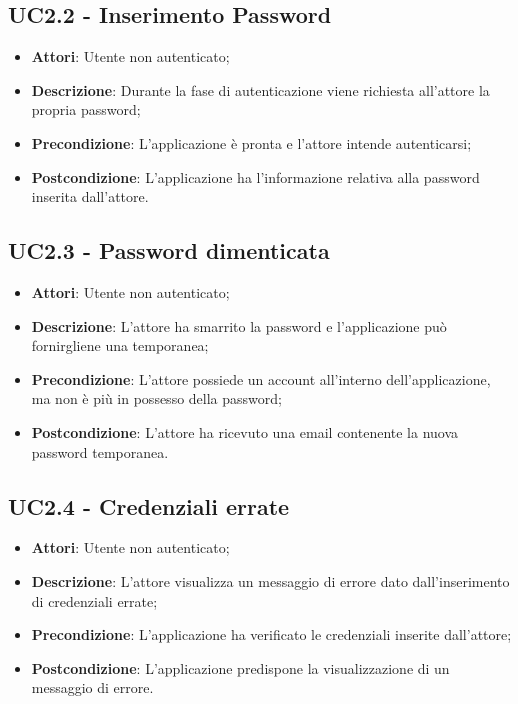 \subsection{UC2.2 - Inserimento Password} 
\label{ssec:UC2.2} 
\begin{itemize} 
\item \textbf{Attori}: Utente non autenticato;
\item \textbf{Descrizione}: Durante la fase di autenticazione viene richiesta all'attore la propria password;
\item \textbf{Precondizione}: L'applicazione è pronta e l'attore intende autenticarsi;
\item \textbf{Postcondizione}: L'applicazione ha l’informazione relativa alla password inserita dall’attore.
\end{itemize} 
\subsection{UC2.3 - Password dimenticata} 
\label{ssec:UC2.3} 
\begin{itemize} 
\item \textbf{Attori}: Utente non autenticato;
\item \textbf{Descrizione}: L'attore ha smarrito la password e l'applicazione può fornirgliene una temporanea;
\item \textbf{Precondizione}: L'attore possiede un account all'interno dell'applicazione, ma non è più in possesso della password;
\item \textbf{Postcondizione}: L'attore ha ricevuto una email contenente la nuova password temporanea.
\end{itemize} 
\subsection{UC2.4 - Credenziali errate} 
\label{ssec:UC2.4} 
\begin{itemize} 
\item \textbf{Attori}: Utente non autenticato;
\item \textbf{Descrizione}: L’attore visualizza un messaggio di errore dato dall’inserimento di credenziali errate;
\item \textbf{Precondizione}: L'applicazione ha verificato le credenziali inserite dall’attore;
\item \textbf{Postcondizione}: L'applicazione predispone la visualizzazione di un messaggio di errore.
\end{itemize} 
